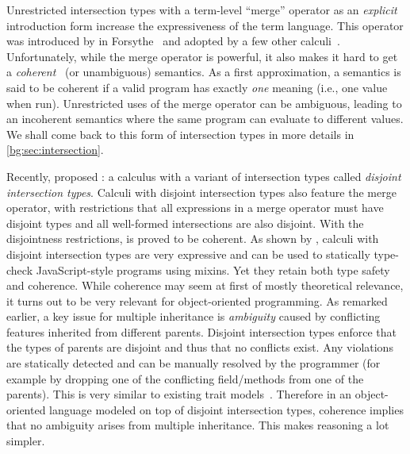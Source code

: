 Unrestricted intersection types with a term-level ``merge'' operator as an \emph{explicit}
introduction form increase the expressiveness of the term
language. This operator was introduced by \citeauthor{reynolds1988preliminary}
in Forsythe~\citep{reynolds1988preliminary} and adopted by a few other
calculi~\citep{Castagna_1992, dunfield2014elaborating, oliveira2016disjoint,
  alpuimdisjoint}. Unfortunately, while the merge operator is powerful, it also
makes it hard to get a \emph{coherent}~\citep{Reynolds_1991} (or unambiguous)
semantics. As a first approximation, a semantics is said to be coherent if a
valid program has exactly \emph{one} meaning (i.e., one value when run).
Unrestricted uses of the merge operator can be ambiguous, leading to an
incoherent semantics where the same program can evaluate to different values.
We shall come back to this form of intersection types in more details in
\cref{bg:sec:intersection}.

Recently, \citet{oliveira2016disjoint} proposed \oname: a calculus with a
variant of intersection types called \emph{disjoint intersection types}. Calculi
with disjoint intersection types also feature the merge operator, with restrictions
that all expressions in a merge operator must have disjoint types and all
well-formed intersections are also disjoint. With the
disjointness restrictions, \oname is proved to be coherent. As shown by \citet{alpuimdisjoint}, calculi with disjoint
intersection types are very expressive and can be used to statically type-check
JavaScript-style programs using mixins. Yet they retain both type safety and
coherence. While coherence may seem at first of mostly theoretical relevance, it
turns out to be very relevant for object-oriented programming. As remarked
earlier, a key issue for multiple inheritance is \emph{ambiguity} caused by
conflicting features inherited from different parents. Disjoint intersection
types enforce that the types of parents are disjoint and thus that no conflicts
exist. Any violations are statically detected and can be manually resolved by
the programmer (for example by dropping one of the conflicting field/methods
from one of the parents). This is very similar to existing trait
models~\citep{scharli2003traits, Ducasse_2006}. Therefore in an object-oriented language
modeled on top of disjoint intersection types, coherence implies that no
ambiguity arises from multiple inheritance. This makes reasoning a lot simpler.

